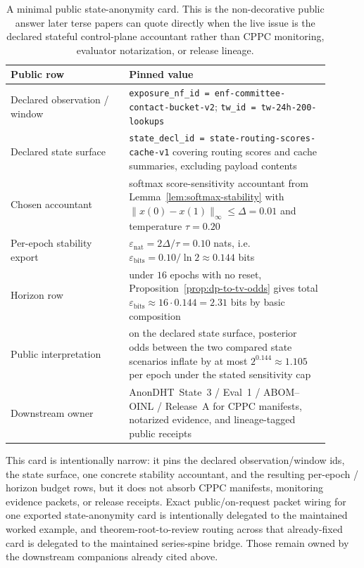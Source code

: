 \documentclass[11pt]{article}
\begin{document}
\begin{table}[t]
\centering
\small
\begin{tabular}{@{}L{0.33\linewidth}L{0.57\linewidth}@{}}
\toprule
\textbf{Public row} & \textbf{Pinned value}\\
\midrule
Declared observation / window & \texttt{exposure\_nf\_id = enf-committee-contact-bucket-v2}; \texttt{tw\_id = tw-24h-200-lookups} \\
Declared state surface & \texttt{state\_decl\_id = state-routing-scores-cache-v1} covering routing scores and cache summaries, excluding payload contents \\
Chosen accountant & softmax score-sensitivity accountant from Lemma~\ref{lem:softmax-stability} with $\|x(0)-x(1)\|_\infty \le \Delta = 0.01$ and temperature $\tau = 0.20$ \\
Per-epoch stability export & $\varepsilon_{\mathrm{nat}} = 2\Delta/\tau = 0.10$ nats, i.e. $\varepsilon_{\mathrm{bits}} = 0.10/\ln 2 \approx 0.144$ bits \\
Horizon row & under $16$ epochs with no reset, Proposition~\ref{prop:dp-to-tv-odds} gives total $\varepsilon_{\mathrm{bits}} \approx 16\cdot 0.144 = 2.31$ bits by basic composition \\
Public interpretation & on the declared state surface, posterior odds between the two compared state scenarios inflate by at most $2^{0.144} \approx 1.105$ per epoch under the stated sensitivity cap \\
Downstream owner & AnonDHT~State~3 / Eval~1 / ABOM--OINL / Release~A for CPPC manifests, notarized evidence, and lineage-tagged public receipts \\
\bottomrule
\end{tabular}
\caption{A minimal public state-anonymity card. This is the non-decorative public answer later terse papers can quote directly when the live issue is the declared stateful control-plane accountant rather than CPPC monitoring, evaluator notarization, or release lineage.}
\label{tab:minimal-state-anonymity-card}
\end{table}

This card is intentionally narrow: it pins the declared observation/window ids, the state surface, one concrete stability accountant, and the resulting per-epoch / horizon budget rows, but it does not absorb CPPC manifests, monitoring evidence packets, or release receipts. Exact public/on-request packet wiring for one exported state-anonymity card is intentionally delegated to the maintained worked example, and theorem-root-to-review routing across that already-fixed card is delegated to the maintained series-spine bridge. Those remain owned by the downstream companions already cited above.\cite{series:state3,series:evalnotary,series:abomoinl,series:release,series:workedexample,series:seriesspines}
\end{document}

